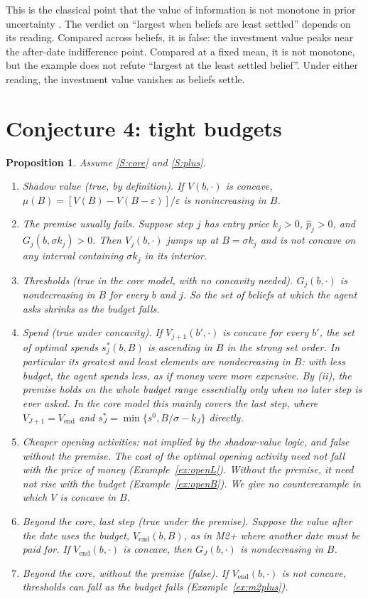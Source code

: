 \documentclass[11pt,a4paper]{article}
\newtheorem{proposition}[theorem]{Proposition}
\theoremstyle{definition}
\theoremstyle{remark}
\newcommand{\Vend}{V_{\mathrm{end}}}
\newcommand{\pp}{\hat p}
\begin{document}
This is the classical point that the value of information is not monotone in prior uncertainty \cite{gould,hilton}. The verdict on ``largest when beliefs are least settled'' depends on its reading. Compared across beliefs, it is false: the investment value peaks near the after-date indifference point. Compared at a fixed mean, it is not monotone, but the example does not refute ``largest at the least settled belief''. Under either reading, the investment value vanishes as beliefs settle.

\section{Conjecture 4: tight budgets}\label{sec:c4}

\begin{proposition}\label{prop:c4}
Assume \ref{S:core} and \ref{S:plus}.
\begin{enumerate}[label=(\roman*)]
\item \emph{Shadow value (true, by definition).} If $V(b,\cdot)$ is concave, $\mu(B)=[V(B)-V(B-\varepsilon)]/\varepsilon$ is nonincreasing in $B$.
\item \emph{The premise usually fails.} Suppose step $j$ has entry price $k_j>0$, $\pp_j>0$, and $G_j(b,\sigma k_j)>0$. Then $V_j(b,\cdot)$ jumps up at $B=\sigma k_j$ and is not concave on any interval containing $\sigma k_j$ in its interior.
\item \emph{Thresholds (true in the core model, with no concavity needed).} $G_j(b,\cdot)$ is nondecreasing in $B$ for every $b$ and $j$. So the set of beliefs at which the agent asks shrinks as the budget falls.
\item \emph{Spend (true under concavity).} If $V_{j+1}(b',\cdot)$ is concave for every $b'$, the set of optimal spends $s_j^*(b,B)$ is ascending in $B$ in the strong set order. In particular its greatest and least elements are nondecreasing in $B$: with less budget, the agent spends less, as if money were more expensive. By (ii), the premise holds on the whole budget range essentially only when no later step is ever asked. In the core model this mainly covers the last step, where $V_{J+1}=\Vend$ and $s_J^*=\min\{s^0,B/\sigma-k_J\}$ directly.
\item \emph{Cheaper opening activities: not implied by the shadow-value logic, and false without the premise.} The cost of the optimal opening activity need not fall with the price of money (Example~\ref{ex:openL}). Without the premise, it need not rise with the budget (Example~\ref{ex:openB}). We give no counterexample in which $V$ is concave in $B$.
\item \emph{Beyond the core, last step (true under the premise).} Suppose the value after the date uses the budget, $\Vend(b,B)$, as in M2+ where another date must be paid for. If $\Vend(b,\cdot)$ is concave, then $G_J(b,\cdot)$ is nondecreasing in $B$.
\item \emph{Beyond the core, without the premise (false).} If $\Vend(b,\cdot)$ is not concave, thresholds can \emph{fall} as the budget falls (Example~\ref{ex:m2plus}).
\end{enumerate}
\end{proposition}
\end{document}
